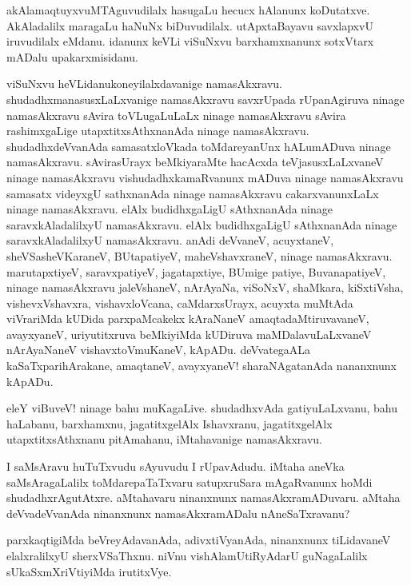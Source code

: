 \begin{mng}
akAlamaqtuyxvuMTAguvudilalx hasugaLu hecucx hAlanunx koDutatxve. AkAladalilx maragaLu haNuNx biDuvudilalx. utApxtaBayavu savxlapxvU iruvudilalx eMdanu. idanunx keVLi viSuNxvu barxhamxnanunx sotxVtarx mADalu upakarxmisidanu.
\end{mng}

\begin{mng}
viSuNxvu heVLidanu\mdash koneyilalxdavanige namasAkxravu. shudadhxmanasusxLaLxvanige namasAkxravu savxrUpada rUpanAgiruva ninage namasAkxravu sAvira toVLugaLuLaLx ninage namasAkxravu sAvira rashimxgaLige utapxtitxsAthxnanAda ninage namasAkxravu. shudadhxdeVvanAda samasatxloVkada toMdareyanUnx hALumADuva ninage namasAkxravu. sAvirasUrayx beMkiyaraMte hacAcxda teVjasusxLaLxvaneV ninage namasAkxravu vishudadhxkamaRvanunx mADuva ninage namasAkxravu samasatx videyxgU sathxnanAda ninage namasAkxravu cakarxvanunxLaLx ninage namasAkxravu. elAlx budidhxgaLigU sAthxnanAda ninage saravxkAladalilxyU namasAkxravu. elAlx budidhxgaLigU sAthxnanAda ninage saravxkAladalilxyU namasAkxravu. anAdi deVvaneV, acuyxtaneV, sheVSasheVKaraneV, BUtapatiyeV, maheVshavxraneV, ninage namasAkxravu. marutapxtiyeV, saravxpatiyeV, jagatapxtiye, BUmige patiye, BuvanapatiyeV, ninage namasAkxravu jaleVshaneV, nArAyaNa, viSoNxV, shaMkara, kiSxtiVsha, vishevxVshavxra, vishavxloVcana, caMdarxsUrayx, acuyxta muMtAda viVrariMda kUDida parxpaMcakekx kAraNaneV amaqtadaMtiruvavaneV, avayxyaneV, uriyutitxruva beMkiyiMda kUDiruva maMDalavuLaLxvaneV nArAyaNaneV vishavxtoVmuKaneV, kApADu. deVvategaALa kaSaTxparihArakane, amaqtaneV, avayxyaneV! sharaNAgatanAda nananxnunx kApADu.
\end{mng}

\begin{mng}
eleY viBuveV! ninage bahu muKagaLive. shudadhxvAda gatiyuLaLxvanu, bahu haLabanu, barxhamxnu, jagatitxgelAlx Ishavxranu, jagatitxgelAlx utapxtitxsAthxnanu pitAmahanu, iMtahavanige namasAkxravu.
\end{mng}

\begin{mng}
I saMsAravu huTuTxvudu sAyuvudu I rUpavAdudu. iMtaha aneVka saMsAragaLalilx toMdarepaTaTxvaru satupxruSara mAgaRvanunx hoMdi shudadhxrAgutAtxre. aMtahavaru ninanxnunx namasAkxramADuvaru. aMtaha deVvadeVvanAda ninanxnunx namasAkxramADalu nAneSaTxravanu?
\end{mng}

\begin{mng}
parxkaqtigiMda beVreyAdavanAda, adivxtiVyanAda, ninanxnunx tiLidavaneV elalxralilxyU sherxVSaThxnu. niVnu vishAlamUtiRyAdarU guNagaLalilx sUkaSxmXriVtiyiMda irutitxVye.
\end{mng}


